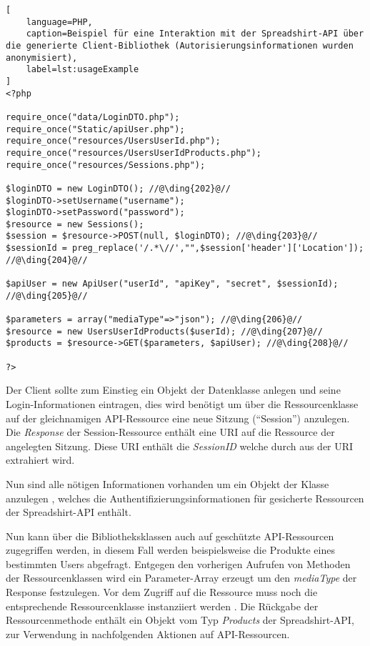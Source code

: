 \begin{minipage}{\textwidth}
\begin{lstlisting}[
    language=PHP,
    caption=Beispiel für eine Interaktion mit der Spreadshirt-API über die generierte Client-Bibliothek (Autorisierungsinformationen wurden anonymisiert),
    label=lst:usageExample
]
<?php

require_once("data/LoginDTO.php");
require_once("Static/apiUser.php");
require_once("resources/UsersUserId.php");
require_once("resources/UsersUserIdProducts.php");
require_once("resources/Sessions.php");

$loginDTO = new LoginDTO(); //@\ding{202}@//
$loginDTO->setUsername("username");
$loginDTO->setPassword("password");
$resource = new Sessions();
$session = $resource->POST(null, $loginDTO); //@\ding{203}@//
$sessionId = preg_replace('/.*\//',"",$session['header']['Location']); //@\ding{204}@//

$apiUser = new ApiUser("userId", "apiKey", "secret", $sessionId); //@\ding{205}@//

$parameters = array("mediaType"=>"json"); //@\ding{206}@//
$resource = new UsersUserIdProducts($userId); //@\ding{207}@//
$products = $resource->GET($parameters, $apiUser); //@\ding{208}@//

?>
\end{lstlisting}
\end{minipage}

Der Client sollte zum Einstieg ein Objekt der Datenklasse  anlegen  und seine Login-Informationen eintragen, dies wird benötigt um über die Ressourcenklasse  auf der gleichnamigen \gls{API}-Ressource eine neue Sitzung (\enquote{Session}) anzulegen.
Die \emph{Response} der Session-Ressource enthält eine \gls{URI} auf die Ressource der angelegten Sitzung. Diese \gls{URI} enthält die \emph{SessionID} welche durch  aus der \gls{URI} extrahiert wird.

Nun sind alle nötigen Informationen vorhanden um ein Objekt der Klasse  anzulegen , welches die Authentifizierungsinformationen für gesicherte Ressourcen der Spreadshirt-\gls{API} enthält.

Nun kann über die Bibliotheksklassen auch auf geschützte \gls{API}-Ressourcen zugegriffen werden, in diesem Fall werden beispielsweise die Produkte eines bestimmten Users abgefragt. Entgegen den vorherigen Aufrufen von Methoden der Ressourcenklassen wird ein Parameter-Array erzeugt  um den \emph{mediaType} der Response festzulegen.
Vor dem Zugriff auf die Ressource muss noch die entsprechende Ressourcenklasse instanziiert werden . Die Rückgabe der Ressourcenmethode enthält ein Objekt vom Typ \emph{Products} der Spreadshirt-\gls{API}, zur Verwendung in nachfolgenden Aktionen auf \gls{API}-Ressourcen.

